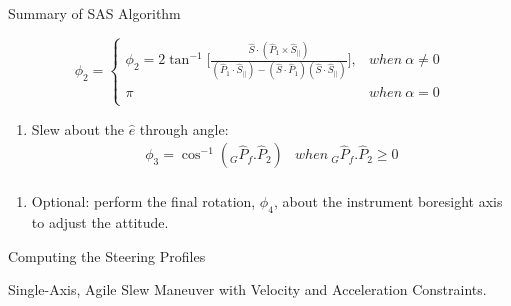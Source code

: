 \documentclass{beamer}
\begin{document}
\begin{frame}{Summary of SAS Algorithm}
\begin{block}{}
\begin{enumerate}[I]
 \begin{equation}\label{phi2}
 \phi_2=\left\{
                \begin{array}{ll}
                \phi_2=2\tan^{-1}\Big[ \frac{\hat{S}\cdot (\hat{P}_1\times\hat{S}_{||})}{(\hat{P}_1\cdot\hat{S}_{||})-(\hat{S}\cdot\hat{P}_1)(\hat{S}\cdot\hat{S}_{||})}\Big],& {\scriptstyle when} \  \alpha\neq 0\\
                 \pi& {\scriptstyle when} \ \alpha=0\\
                \end{array}
              \right.
 \end{equation}
\end{enumerate}
\begin{enumerate}[III]
 \item Slew about the $\hat{e}$ through angle:
 \begin{equation}
	 \begin{array}{lr}
	 \phi_3 = \cos^{-1}(_G\hat{P}_f.\hat{P}_2) & {\scriptstyle when} \  _G\hat{P}_f.\hat{P}_2\geq 0\\
	 \end{array}
 \end{equation}
\end{enumerate}
\begin{enumerate}[IV]
\item Optional: perform the final rotation, $\phi_4$, about the instrument boresight axis to adjust the attitude. 
\end{enumerate}
\end{block}
\end{frame}
%
%
%
%
\begin{frame}
\begin{block}{}
\begin{center}
{\LARGE{Computing the Steering Profiles}}
\begin{center}
 Single-Axis, Agile Slew Maneuver with Velocity and Acceleration Constraints.
\end{center}
\end{center}
\end{block}
\end{frame}
\end{document}
